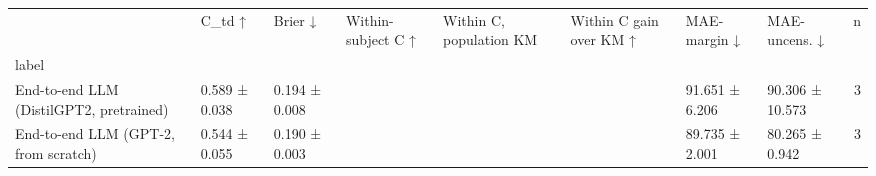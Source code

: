 \begin{tabular}{llllllllr}
\toprule
 & C\_td ↑ & Brier ↓ & Within-subject C ↑ & Within C, population KM & Within C gain over KM ↑ & MAE-margin ↓ & MAE-uncens. ↓ & n \\
label &  &  &  &  &  &  &  &  \\
\midrule
End-to-end LLM (DistilGPT2, pretrained) & 0.589 ± 0.038 & 0.194 ± 0.008 &  &  &  & 91.651 ± 6.206 & 90.306 ± 10.573 & 3 \\
End-to-end LLM (GPT-2, from scratch) & 0.544 ± 0.055 & 0.190 ± 0.003 &  &  &  & 89.735 ± 2.001 & 80.265 ± 0.942 & 3 \\
\bottomrule
\end{tabular}
